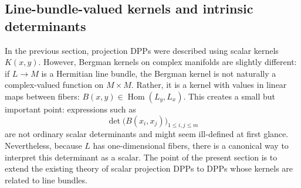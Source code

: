 \documentclass[12pt,a4paper,reqno]{article}
\theoremstyle{thmstyleone}
\theoremstyle{thmstylethree}
\theoremstyle{thmstyletwo}
\numberwithin{equation}{subsection}
\def\leq{\leqslant}
\begin{document}



\subsection{Line-bundle-valued kernels and intrinsic determinants}
\label{sec:line-bundle-kernels}

In the previous section, projection DPPs were described using scalar kernels $K(x,y)$. However, Bergman kernels on complex manifolds are slightly different: if $L\to M$ is a Hermitian line bundle, the Bergman kernel is not naturally a complex-valued function on $M\times M$. Rather, it is a kernel with values in linear maps between fibers: $B(x,y)\in \operatorname{Hom}(L_y,L_x).$ This creates a small but important point: expressions such as
\[
    \det\big(B(x_i,x_j)\big)_{1\leq i,j\leq m}
\]
are not ordinary scalar determinants and might seem ill-defined at first glance. Nevertheless, because $L$ has one-dimensional fibers, there is a canonical way to interpret this determinant as a scalar. The point of the present section is to extend the existing theory of scalar projection DPPs to DPPs whose kernels are related to line bundles.
\end{document}
